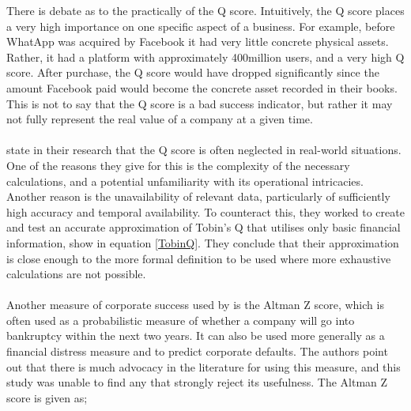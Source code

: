 {There is debate as to the practically of the Q score. Intuitively, the Q score places a very high importance on one specific aspect of a business. For example, before WhatApp was acquired by Facebook it had very little concrete physical assets. Rather, it had a platform with approximately 400million users, and a very high Q score. After purchase, the Q score would have dropped significantly since the amount Facebook paid would become the concrete asset recorded in their books. This is not to say that the Q score is a bad success indicator, but rather it may not fully represent the real value of a company at a given time.\\\\    \cite{chung1994simple} state in their research that the Q score is often neglected in real-world situations. One of the reasons they give for this is the complexity of the necessary calculations, and a potential unfamiliarity with its operational intricacies. Another reason is the unavailability of relevant data, particularly of sufficiently high accuracy and temporal availability. To counteract this, they worked to create and test an accurate approximation of Tobin's Q that utilises only basic financial information, show in equation \ref{TobinQ}.  They conclude that their approximation is close enough to the more formal definition to be used where more exhaustive calculations are not possible. \\\\
Another measure of corporate success used by \cite{moldovan2015learning} is the Altman Z score, which is often used as a probabilistic measure of whether a company will go into bankruptcy within the next two years. It can also be used more generally as a financial distress measure and to predict corporate defaults. The authors point out that there is much advocacy in the literature for using this measure, and this study was unable to find any that strongly reject its usefulness. The Altman Z score is given as;
}
